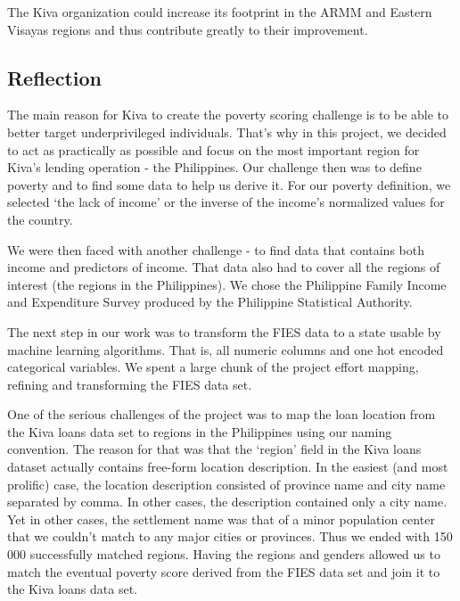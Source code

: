 \documentclass{article}
\begin{document}
The Kiva organization could increase its footprint in the ARMM and Eastern Visayas regions and thus contribute greatly to their improvement.

\subsection{Reflection}

The main reason for Kiva to create the poverty scoring challenge is to be able to better target underprivileged individuals. That’s why in this project, we decided to act as practically as possible and focus on the most important region for Kiva’s lending operation - the Philippines. Our challenge then was to define poverty and to find some data to help us derive it. For our poverty definition, we selected ‘the lack of income’ or the inverse of the income’s normalized values for the country.

We were then faced with another challenge - to find data that contains both income and predictors of income. That data also had to cover all the regions of interest (the regions in the Philippines). We chose the Philippine Family Income and Expenditure Survey produced by the Philippine Statistical Authority.

The next step in our work was to transform the FIES data to a state usable by machine learning algorithms. That is, all numeric columns and one hot encoded categorical variables. We spent a large chunk of the project effort mapping, refining and transforming the FIES data set.

One of the serious challenges of the project was to map the loan location from the Kiva loans data set to regions in the Philippines using our naming convention. The reason for that was that the ‘region’ field in the Kiva loans dataset actually contains free-form location description. In the easiest (and most prolific) case, the location description consisted of province name and city name separated by comma. In other cases, the description contained only a city name. Yet in other cases, the settlement name was that of a minor population center that we couldn’t match to any major cities or provinces. Thus we ended with 150 000 successfully matched regions. Having the regions and genders allowed us to match the eventual poverty score derived from the FIES data set and join it to the Kiva loans data set.
\end{document}
